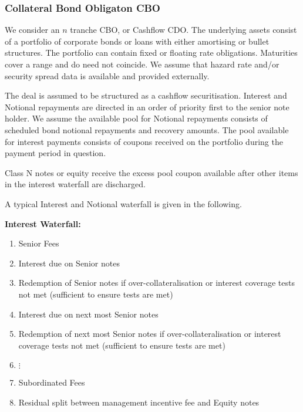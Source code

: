 \subsubsection{Collateral Bond Obligaton CBO}

We consider an $n$ tranche CBO, or Cashflow CDO. 
The underlying assets consist of a portfolio of corporate bonds or loans with either amortising or bullet structures. 
The portfolio can contain fixed or floating rate obligations. 
Maturities cover a range and do need not coincide. 
We assume that hazard rate and/or security spread data is available and provided externally.

The deal is assumed to be structured as a cashflow securitisation. 
Interest and Notional repayments are directed in an order of priority first to the senior note holder. 
We assume the  available pool for Notional repayments consists of scheduled bond notional repayments and recovery amounts. 
The pool available for interest payments consists of coupons received on the portfolio during the payment period in question.

Class N notes or equity receive the excess pool coupon available after other items in the interest waterfall are discharged.

A typical Interest and Notional waterfall is given in the following.

\bigskip
{\bf Interest Waterfall:}

\begin{enumerate}
\item Senior Fees
\item Interest due on Senior notes
\item Redemption of Senior notes if over-collateralisation or interest coverage tests not met (sufficient to ensure tests are met)
\item Interest due on next most Senior notes
\item Redemption of next most Senior notes if over-collateralisation or interest coverage tests not met (sufficient to ensure tests are met)
\item $\vdots$
\item Subordinated Fees
\item Residual split between management incentive fee and Equity notes
\end{enumerate}

\bigskip

